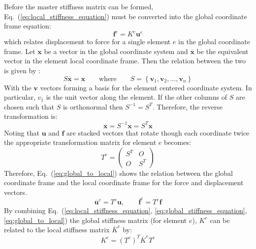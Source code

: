 \documentclass{article}
\begin{document}
Before the master stiffness matrix can be formed,
Eq.~(\ref{eq:local_stiffness_equation}) must be converted into the global
coordinate frame equation:
\begin{equation}
    \mathbf{f}^e=K^e\mathbf{u}^e\label{eq:global_stiffness_equation}
\end{equation}
which relates displacement to force for a single element $e$ in the global
coordinate frame.  Let $\mathbf{x}$ be a vector in the global coordinate
system and $\overline{\mathbf{x}}$ be the equivalent vector in the element
local coordinate frame.  Then the relation between the two is given by
\parencite{olver2006}:
\begin{equation}
    S\overline{\mathbf{x}}=\mathbf{x}\qquad\text{where}\qquad
    S=\left\{\mathbf{v}_1,\mathbf{v}_2,\ldots,\mathbf{v}_n\right\}
\end{equation}
With the $\mathbf{v}$ vectors forming a basis for the element centered
coordinate system.  In particular, $v_1$ is the unit vector along the element.
If the other columns of $S$ are chosen such that $S$ is orthonormal then
$S^{-1}=S^{T}$.  Therefore, the reverse transformation is:
\begin{equation}
    \overline{\mathbf{x}}=S^{-1}\mathbf{x}=S^T\mathbf{x}
\end{equation}
Noting that $\mathbf{u}$ and $\mathbf{f}$ are stacked vectors that rotate
though each coordinate twice the appropriate transformation matrix for element
$e$ becomes:
\begin{equation}
    T^e=\begin{pmatrix}
        S^T&O\\O&S^T
    \end{pmatrix}
\end{equation}
Therefore, Eq.~(\ref{eq:global_to_local}) shows the relation between the
global coordinate frame and the local coordinate frame for the force and
displacement vectors.
\begin{equation}
    \overline{\mathbf{u}}^e=T^e\mathbf{u},\qquad
    \overline{\mathbf{f}}^e=T^e\mathbf{f}
    \label{eq:global_to_local}
\end{equation}
By combining Eq.~(\ref{eq:local_stiffness_equation},
\ref{eq:global_stiffness_equation}, \ref{eq:global_to_local}) the global
stiffness matrix (for element $e$), $K^e$ can be related to the local
stiffness matrix $\overline{K}^e$ by:
\begin{equation}
    K^e=(T^e)^T\overline{K}^eT^e
\end{equation}
\end{document}
